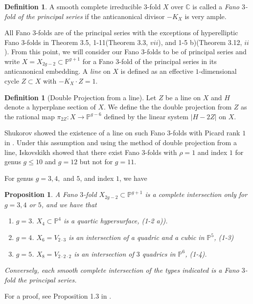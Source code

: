 \documentclass[11pt]{amsart}
\theoremstyle{plain}
\newtheorem{proposition}[theorem]{Proposition}
\theoremstyle{definition}
\newtheorem{definition}[theorem]{Definition}
\theoremstyle{expl}
\begin{document}
\begin{definition}
    A smooth complete irreducible $3$-fold $X$ over $\mathbb{C}$ is called a \textit{Fano $3$-fold of the principal series} if the anticanonical divisor $-K_X$ is very ample.
\end{definition}
All Fano $3$-folds are of the principal series with the exceptions of hyperelliptic Fano $3$-folds in Theorem 3.5, 1-11(Theorem 3.3, $vii$), and 1-5 b)(Theorem 3.12, $ii$).  From this point, we will consider our Fano $3$-folds to be of principal series and write $X = X_{2g-2} \subset \mathbb{P}^{g+1}$ for a Fano $3$-fold of the principal series in its anticanonical embedding.
\medbreak
A \textit{line} on $X$ is defined as an effective $1$-dimensional cycle $Z \subset X$ with $-K_X \cdot Z=1$. 
\begin{definition}[Double Projection from a line]
Let $Z$ be a line on $X$ and $H$ denote a hyperplane section of $X$. We define the the double projection from $Z$ as the rational map $\pi_{2Z}: X \to \mathbb{P}^{g-6}$ defined by the linear system $|H-2Z|$ on $X$.
\end{definition}
Shukorov showed the existence of a line on such Fano $3$-folds with Picard rank $1$ in \cite{Sokuline}. Under this assumption and using the method of double projection from a line, Iskovskikh showed that there exist Fano $3$-folds with $\rho =1$ and index $1$ for genus $g \leq 10$ and $g=12$ but not for $g=11$.

For genus $g=3, 4,$ and $5$, and index $1$, we have 
\begin{proposition}
    A Fano $3$-fold $X_{2g-2}\subset \mathbb{P}^{g+1}$ is a complete intersection only for $g=3, 4$ or $5$, and we have that 
    \begin{enumerate}
    \item[(i)]$g=3$. $X_4 \subset \mathbb{P}^4$ is a quartic hypersurface, (1-2 a)).
    \item[(ii)]$g=4$. $X_6 = V_{2\cdot 3}$ is an intersection of a quadric and a cubic in $\mathbb{P}^5$, (1-3)
    \item[(iii)]$g=5$. $X_8 = V_{2\cdot 2\cdot 2}$ is an intersection of $3$ quadrics in $\mathbb{P}^6$, (1-4).
    \end{enumerate}
    Conversely, each smooth complete intersection of the types indicated is a Fano $3$-fold the principal series. 
\end{proposition}
For a proof, see Proposition 1.3 in \cite{Isk78}.
 
\end{document}
